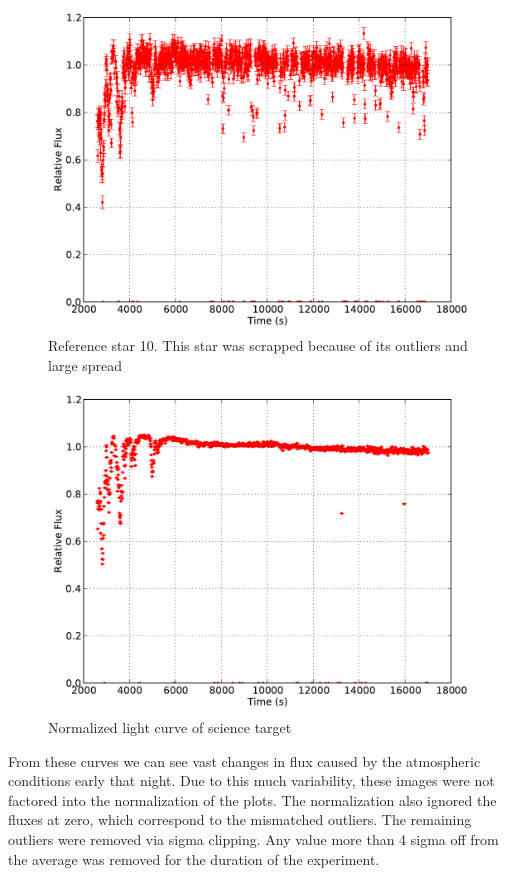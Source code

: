\documentclass{aastex61}
\begin{document}
\begin{figure}[h]
	\centering
	\includegraphics[scale = .30]{exo_curves10.pdf}
	\caption{Reference star 10. This star was scrapped because of its outliers and large spread}
	\label{fig: refcurve10}
\end{figure}
\begin{figure}[h]
	\centering
	\includegraphics[scale = .30]{exo_curves11.pdf}
	\caption{Normalized light curve of science target}
	\label{fig: scicurve1}
\end{figure}

From these curves we can see vast changes in flux caused by the atmospheric conditions early that night. Due to this much variability, these images were not factored into the normalization of the plots. The normalization also ignored the fluxes at zero, which correspond to the mismatched outliers. The remaining outliers were removed via sigma clipping. Any value more than 4 sigma off from the average was removed for the duration of the experiment.
\end{document}
